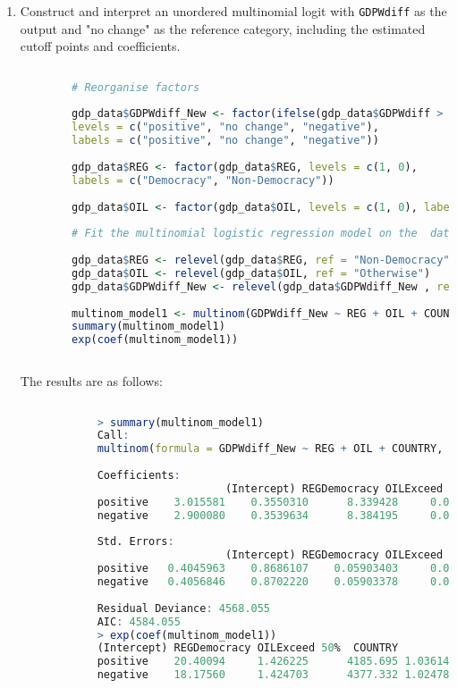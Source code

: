 \documentclass[12pt,letterpaper]{article}
\begin{document}
\begin{enumerate}
	\item Construct and interpret an unordered multinomial logit with \texttt{GDPWdiff} as the output and "no change" as the reference category, including the estimated cutoff points and coefficients.
	
	\begin{lstlisting}[language=R]
		
		# Reorganise factors
		
		gdp_data$GDPWdiff_New <- factor(ifelse(gdp_data$GDPWdiff > 0, "positive", ifelse(gdp_data$GDPWdiff < 0, "negative", "no change")),
		levels = c("positive", "no change", "negative"),
		labels = c("positive", "no change", "negative"))
		
		gdp_data$REG <- factor(gdp_data$REG, levels = c(1, 0),
		labels = c("Democracy", "Non-Democracy"))
				
		gdp_data$OIL <- factor(gdp_data$OIL, levels = c(1, 0), labels = c("Exceed 50%", "Otherwise"))
		
		# Fit the multinomial logistic regression model on the  data
		
		gdp_data$REG <- relevel(gdp_data$REG, ref = "Non-Democracy")
		gdp_data$OIL <- relevel(gdp_data$OIL, ref = "Otherwise")
		gdp_data$GDPWdiff_New <- relevel(gdp_data$GDPWdiff_New , ref = "no change")
		
		multinom_model1 <- multinom(GDPWdiff_New ~ REG + OIL + COUNTRY, data = gdp_data)
		summary(multinom_model1)
		exp(coef(multinom_model1))
		
	\end{lstlisting}
	
The results are as follows:

		\begin{lstlisting}[language=R]
			
			> summary(multinom_model1)
			Call:
			multinom(formula = GDPWdiff_New ~ REG + OIL + COUNTRY, data = gdp_data)
			
			Coefficients:
								(Intercept) REGDemocracy OILExceed 50% 	COUNTRY
			positive    3.015581    0.3550310      8.339428 	0.03550780
			negative    2.900080    0.3539634      8.384195 	0.02447895
			
			Std. Errors:
								(Intercept) REGDemocracy OILExceed 50%  COUNTRY
			positive   0.4045963    0.8686107    0.05903403 	0.01064706
			negative   0.4056846    0.8702220    0.05903378 	0.01066312
			
			Residual Deviance: 4568.055 
			AIC: 4584.055 
			> exp(coef(multinom_model1))
			(Intercept) REGDemocracy OILExceed 50%  COUNTRY
			positive    20.40094     1.426225      4185.695 1.036146
			negative    18.17560     1.424703      4377.332 1.024781
			

\end{lstlisting}
\end{enumerate}
\end{document}
